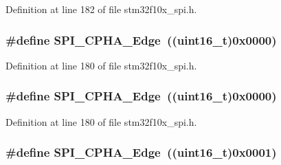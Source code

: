 Definition at line 182 of file stm32f10x\+\_\+spi.\+h.

\subsubsection[{\texorpdfstring{S\+P\+I\+\_\+\+C\+P\+H\+A\+\_\+1\+Edge}{SPI_CPHA_1Edge}}]{\setlength{\rightskip}{0pt plus 5cm}\#define S\+P\+I\+\_\+\+C\+P\+H\+A\+\_\+Edge~(({\bf uint16\+\_\+t})0x0000)}\hypertarget{group___s_p_i___clock___phase_gaade9d9555fac8a302bde5c94da9c7292}{}\label{group___s_p_i___clock___phase_gaade9d9555fac8a302bde5c94da9c7292}


Definition at line 180 of file stm32f10x\+\_\+spi.\+h.

\subsubsection[{\texorpdfstring{S\+P\+I\+\_\+\+C\+P\+H\+A\+\_\+1\+Edge}{SPI_CPHA_1Edge}}]{\setlength{\rightskip}{0pt plus 5cm}\#define S\+P\+I\+\_\+\+C\+P\+H\+A\+\_\+Edge~(({\bf uint16\+\_\+t})0x0000)}\hypertarget{group___s_p_i___clock___phase_gaade9d9555fac8a302bde5c94da9c7292}{}\label{group___s_p_i___clock___phase_gaade9d9555fac8a302bde5c94da9c7292}


Definition at line 180 of file stm32f10x\+\_\+spi.\+h.

\subsubsection[{\texorpdfstring{S\+P\+I\+\_\+\+C\+P\+H\+A\+\_\+2\+Edge}{SPI_CPHA_2Edge}}]{\setlength{\rightskip}{0pt plus 5cm}\#define S\+P\+I\+\_\+\+C\+P\+H\+A\+\_\+Edge~(({\bf uint16\+\_\+t})0x0001)}\hypertarget{group___s_p_i___clock___phase_ga7543f88bf05a08705eb4203862dcebdf}{}\label{group___s_p_i___clock___phase_ga7543f88bf05a08705eb4203862dcebdf}


